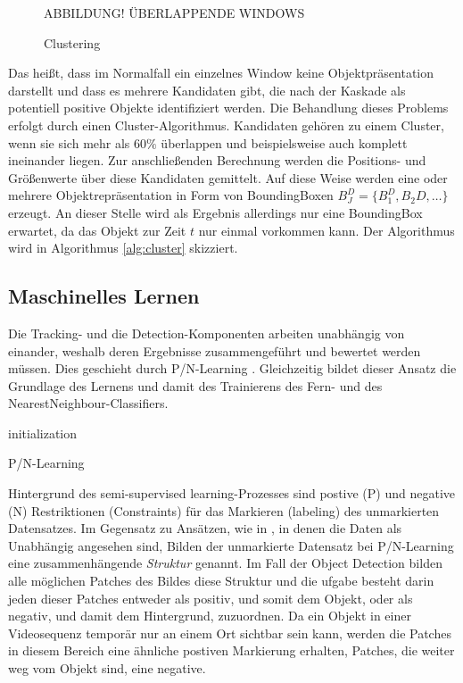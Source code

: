 	\begin{figure}
		\begin{centering}
			ABBILDUNG! ÜBERLAPPENDE WINDOWS
			\caption{Clustering}
			\label{abb:cluster}
			\par
		\end{centering}
	\end{figure}

	Das heißt, dass im Normalfall ein einzelnes Window keine Objektpräsentation darstellt und dass es mehrere Kandidaten gibt, die nach der Kaskade als potentiell positive Objekte identifiziert werden. Die Behandlung dieses Problems erfolgt durch einen Cluster-Algorithmus. Kandidaten gehören zu einem Cluster, wenn sie sich mehr als $60\%$ überlappen und beispielsweise auch komplett ineinander liegen. Zur anschließenden Berechnung werden die Positions- und Größenwerte über diese Kandidaten gemittelt. Auf diese Weise werden eine oder mehrere Objektrepräsentation in Form von BoundingBoxen $B_J^D = \{B_1^D, B_2D, \dots\}$ erzeugt. An dieser Stelle wird als Ergebnis allerdings nur eine BoundingBox erwartet, da das Objekt zur Zeit $t$ nur einmal vorkommen kann. Der Algorithmus wird in Algorithmus \ref{alg:cluster} skizziert.

	\subsection{Maschinelles Lernen}
	\label{subsection:machine_learning}
	Die Tracking- und die Detection-Komponenten arbeiten unabhängig von einander, weshalb deren Ergebnisse zusammengeführt und bewertet werden müssen. Dies geschieht durch P/N-Learning \cite{PNL}. Gleichzeitig bildet dieser Ansatz die Grundlage des Lernens und damit des Trainierens
	des Fern- und des NearestNeighbour-Classifiers.

	\begin{algorithm}
	\vspace{0.2cm}
	initialization\;
	\caption{P/N-Learning}
	\label{alg:learning}
	\vspace{0.2cm}
	\end{algorithm}

	Hintergrund des semi-supervised learning-Prozesses sind postive (P)	und negative (N) Restriktionen (Constraints) für das Markieren (labeling)	des unmarkierten Datensatzes. Im Gegensatz zu Ansätzen, wie in \cite{TCL} \cite{CLU}, in denen die Daten als Unabhängig angesehen sind, Bilden der unmarkierte Datensatz bei P/N-Learning eine zusammenhängende \textit{Struktur} genannt. Im Fall der Object Detection bilden alle möglichen Patches des Bildes diese Struktur und die ufgabe besteht darin jeden dieser Patches entweder als positiv, und somit dem Objekt, oder als negativ, und damit dem Hintergrund, zuzuordnen. Da ein Objekt in einer Videosequenz temporär nur an einem Ort sichtbar sein kann, werden die Patches in diesem Bereich eine ähnliche postiven Markierung erhalten, Patches, die weiter weg vom Objekt sind, eine negative.

